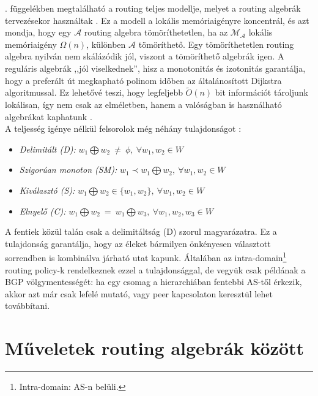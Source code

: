     . függelékben megtalálható a routing teljes modellje, melyet a routing algebrák tervezésekor használtak \cite{Sobrinho_Network_routing}. Ez a modell a lokális memóriaigényre koncentrál, és azt mondja, hogy egy $\mathcal{A}$ routing algebra tömöríthetetlen, ha az $\mathcal{M_{\mathcal{A}}}$ lokális memóriaigény $\Omega(n)$, különben $\mathcal{A}$ tömöríthető. Egy tömöríthetetlen routing algebra nyilván nem skálázódik jól, viszont a tömöríthető algebrák igen. A reguláris algebrák ,,jól viselkednek'', hisz a monotonitás és izotonitás garantálja, hogy a preferált út megkapható polinom időben az általánosított Dijkstra algoritmussal. Ez lehetővé teszi, hogy legfeljebb $\tilde{O}(n)$ bit információt tároljunk lokálisan, így nem csak az elméletben, hanem a valóságban is használható algebrákat kaphatunk \cite{Sobrinho_Network_routing, Sobrinho_Metarouting}.\\

    A teljesség igénye nélkül felsorolok még néhány tulajdonságot \cite{Lexicographic_products_in_metarouting}:
    \begin{itemize}
      \item \emph{ Delimitált (D):} $w_{1} \bigoplus w_{2} ~\neq~\phi, ~\forall w_{1}, w_{2} \in W$
      \item \emph{ Szigorúan monoton (SM):} $w_{1} \prec w_{1} \bigoplus w_{2}, ~\forall w_{1}, w_{2} \in W$
      \item \emph{ Kiválasztó (S):} $w_{1} \bigoplus w_{2} \in \{w_{1}, w_{2}\}, ~\forall w_{1}, w_{2} \in W$
      \item \emph{ Elnyelő (C):} $w_{1} \bigoplus w_{2} ~=~ w_{1} \bigoplus w_{3}, ~\forall w_{1}, w_{2}, w_{3} \in W$
    \end{itemize}

    A fentiek közül talán csak a delimitáltság (D) szorul magyarázatra. Ez a tulajdonság garantálja, hogy az éleket bármilyen önkényesen választott sorrendben is kombinálva járható utat kapunk. Általában az intra-domain\footnote{Intra-domain: AS-n belüli.} routing policy-k rendelkeznek ezzel a tulajdonsággal, de vegyük csak példának a BGP völgymentességét: ha egy csomag a hierarchiában fentebbi AS-től érkezik, akkor azt már csak lefelé mutató, vagy peer kapcsolaton keresztül lehet továbbítani.

  \section{Műveletek routing algebrák között}\label{sect:section_algebramuveletek}

